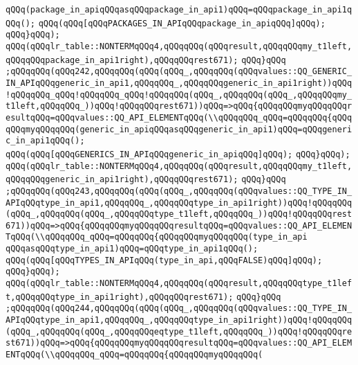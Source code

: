 \verb|qQQq(package_in_apiqQQqasqQQqpackage_in_api1)qQQq=qQQqpackage_in_api1qQQq();|\newline
\verb|qQQq(qQQq[qQQqPACKAGES_IN_APIqQQqpackage_in_apiqQQq]qQQq);|\newline
\verb|qQQq}qQQq);|\newline
\verb|qQQq(qQQqlr_table::NONTERMqQQq4,qQQqqQQq(qQQqresult,qQQqqQQqmy_t1left,qQQqqQQqpackage_in_api1right),qQQqqQQqrest671);|\newline
\verb|qQQq}qQQq|\newline
\verb|;qQQqqQQq(qQQq242,qQQqqQQq(qQQq(qQQq_,qQQqqQQq(qQQqvalues::QQ_GENERIC_IN_APIqQQqgeneric_in_api1,qQQqqQQq_,qQQqqQQqgeneric_in_api1right))qQQq!qQQqqQQq_qQQq!qQQqqQQq_qQQq!qQQqqQQq(qQQq_,qQQqqQQq(qQQq_,qQQqqQQqmy_t1left,qQQqqQQq_))qQQq!qQQqqQQqrest671))qQQq=>qQQq{qQQqqQQqmyqQQqqQQqresultqQQq=qQQqvalues::QQ_API_ELEMENTqQQq(\\qQQqqQQq_qQQq=qQQqqQQq{qQQq|\newline
\verb|qQQqmyqQQqqQQq(generic_in_apiqQQqasqQQqgeneric_in_api1)qQQq=qQQqgeneric_in_api1qQQq();|\newline
\verb|qQQq(qQQq[qQQqGENERICS_IN_APIqQQqgeneric_in_apiqQQq]qQQq);|\newline
\verb|qQQq}qQQq);|\newline
\verb|qQQq(qQQqlr_table::NONTERMqQQq4,qQQqqQQq(qQQqresult,qQQqqQQqmy_t1left,qQQqqQQqgeneric_in_api1right),qQQqqQQqrest671);|\newline
\verb|qQQq}qQQq|\newline
\verb|;qQQqqQQq(qQQq243,qQQqqQQq(qQQq(qQQq_,qQQqqQQq(qQQqvalues::QQ_TYPE_IN_APIqQQqtype_in_api1,qQQqqQQq_,qQQqqQQqtype_in_api1right))qQQq!qQQqqQQq(qQQq_,qQQqqQQq(qQQq_,qQQqqQQqtype_t1left,qQQqqQQq_))qQQq!qQQqqQQqrest671))qQQq=>qQQq{qQQqqQQqmyqQQqqQQqresultqQQq=qQQqvalues::QQ_API_ELEMENTqQQq(\\qQQqqQQq_qQQq=qQQqqQQq{qQQqqQQqmyqQQqqQQq(type_in_api|\newline
\verb|qQQqasqQQqtype_in_api1)qQQq=qQQqtype_in_api1qQQq();|\newline
\verb|qQQq(qQQq[qQQqTYPES_IN_APIqQQq(type_in_api,qQQqFALSE)qQQq]qQQq);|\newline
\verb|qQQq}qQQq);|\newline
\verb|qQQq(qQQqlr_table::NONTERMqQQq4,qQQqqQQq(qQQqresult,qQQqqQQqtype_t1left,qQQqqQQqtype_in_api1right),qQQqqQQqrest671);|\newline
\verb|qQQq}qQQq|\newline
\verb|;qQQqqQQq(qQQq244,qQQqqQQq(qQQq(qQQq_,qQQqqQQq(qQQqvalues::QQ_TYPE_IN_APIqQQqtype_in_api1,qQQqqQQq_,qQQqqQQqtype_in_api1right))qQQq!qQQqqQQq(qQQq_,qQQqqQQq(qQQq_,qQQqqQQqeqtype_t1left,qQQqqQQq_))qQQq!qQQqqQQqrest671))qQQq=>qQQq{qQQqqQQqmyqQQqqQQqresultqQQq=qQQqvalues::QQ_API_ELEMENTqQQq(\\qQQqqQQq_qQQq=qQQqqQQq{qQQqqQQqmyqQQqqQQq(|\newline
